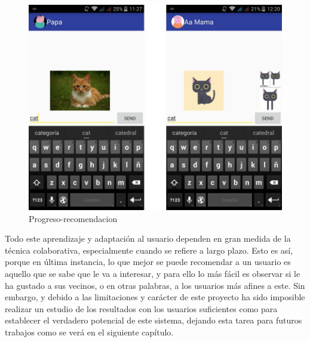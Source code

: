 \begin{figure}[!h]
\begin{center}
\includegraphics[width=1.1\textwidth]{./figures/progreso-recomendacion.jpg}
\caption{Progreso-recomendacion}
\label{fig:progreso-recomendacion}
\end{center}
\end{figure}

Todo este aprendizaje y adaptación al usuario dependen en gran medida de la técnica colaborativa, especialmente cuando se refiere a largo plazo. Esto es así, porque en última instancia, lo que mejor se puede recomendar a un usuario es aquello que se sabe que le va a interesar, y para ello lo más fácil es observar si le ha gustado a sus vecinos, o en otras palabras, a los usuarios más afines a este. Sin embargo, y debido a las limitaciones y carácter de este proyecto ha sido imposible realizar un estudio de los resultados con los usuarios suficientes como para establecer el verdadero potencial de este sistema, dejando esta tarea para futuros trabajos como se verá en el siguiente capítulo.